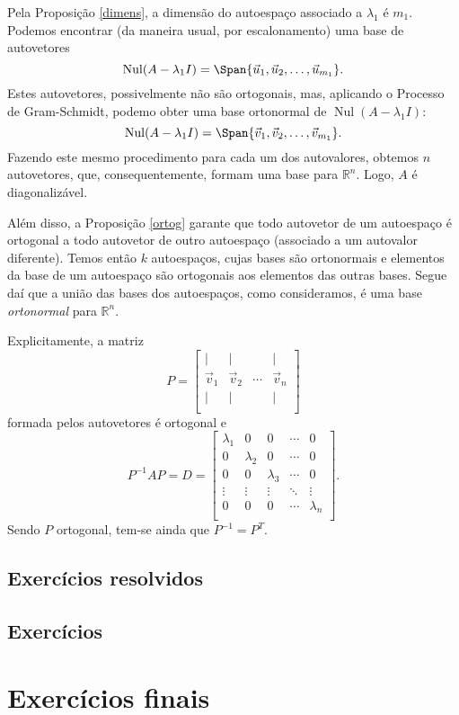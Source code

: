 Pela Proposição \ref{dimens}, a dimensão do autoespaço associado a $\lambda_1$ é $m_1$. Podemos encontrar (da maneira usual, por escalonamento) uma base de autovetores
\begin{equation}
\operatorname{Nul} (A - \lambda_1 I) = \Span \{ \vec{u}_1, \vec{u}_2, \dots, \vec{u}_{m_1} \}.
\end{equation} Estes autovetores, possivelmente não são ortogonais, mas, aplicando o Processo de Gram-Schmidt, podemo obter uma base ortonormal de $\operatorname{Nul} (A - \lambda_1 I)$:
\begin{equation}
\operatorname{Nul} (A - \lambda_1 I) = \Span \{ \vec{v}_1, \vec{v}_2, \dots, \vec{v}_{m_1} \}.
\end{equation} Fazendo este mesmo procedimento para cada um dos autovalores, obtemos $n$ autovetores, que, consequentemente, formam uma base para $\mathbb{R}^n$. Logo, $A$ é diagonalizável.

Além disso, a Proposição \ref{ortog} garante que todo autovetor de um autoespaço é ortogonal a todo autovetor de outro autoespaço (associado a um autovalor diferente). Temos então $k$ autoespaços, cujas bases são ortonormais e elementos da base de um autoespaço são ortogonais aos elementos das outras bases. Segue daí que a união das bases dos autoespaços, como consideramos, é uma base \textit{ortonormal} para $\mathbb{R}^n$.

Explicitamente, a matriz
\begin{equation}
P =
\begin{bmatrix}
| & | & & | \\
\vec{v}_1 & \vec{v}_2 & \cdots &  \vec{v}_n \\
| & | &  & | \\
\end{bmatrix}
\end{equation} formada pelos autovetores é ortogonal e
\begin{equation}
P^{-1} A P = D =
\begin{bmatrix}
\lambda_1 & 0 & 0 & \cdots & 0 \\
0 & \lambda_2 & 0 & \cdots & 0 \\
0 & 0 & \lambda_3 & \cdots & 0 \\
\vdots & \vdots & \vdots & \ddots & \vdots \\
0 & 0 & 0 & \cdots & \lambda_n \\
\end{bmatrix}.
\end{equation} Sendo $P$ ortogonal, tem-se ainda que $P^{-1} = P^T$.

\subsection*{Exercícios resolvidos}

\construirExeresol

\subsection*{Exercícios}

\construirExer

\section{Exercícios finais}

\construirExer

%
